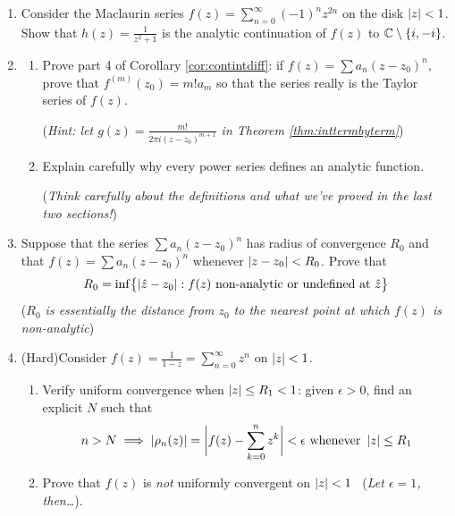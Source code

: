 \begin{exercises}
\begin{enumerate}
		
		\item Consider the Maclaurin series $f(z)=\sum_{n=0}^\infty (-1)^nz^{2n}$ on the disk $\left| z\right|<1$. Show that $h(z)=\frac 1{z^2+1}$ is the analytic continuation of $f(z)$ to $\mathbb{C}\setminus\{i,-i\}$. 
		
		
		\item\label{ex:uniquetaylor}\begin{enumerate}
		  \item Prove part 4 of Corollary \ref{cor:contintdiff}: if $f(z)= \sum a_n(z-z_0)^n$, prove that $f^{(m)}(z_0)=m!a_m$ so that the series really is the Taylor series of $f(z)$.\par
			(\emph{Hint: let $g(z) =\frac{m!}{2\pi i(z-z_0)^{m+1}}$ in Theorem \ref{thm:inttermbyterm}})
			\item Explain carefully why every power series defines an analytic function.\par
	  (\emph{Think carefully about the definitions and what we've proved in the last two sections!})
		\end{enumerate}
		
		
		\item\label{exs:raddistnonanalytic} Suppose that the series $\sum a_n(z-z_0)^n$ has radius of convergence $R_0$ and that $f(z)=\sum a_n(z-z_0)^n$ whenever $\left| z-z_0\right|<R_0$. Prove that
		\[
			R_0=\inf\bigl\{\left| \hat z-z_0\right|:f(z)\text{ non-analytic or undefined at $\hat z$}\bigr\}
		\]
		(\emph{$R_0$ is essentially the distance from $z_0$ to the nearest point at which $f(z)$ is non-analytic})
		
		
		\item\label{ex:notuniform} (Hard)\lstsp Consider $f(z)=\frac 1{1-z}=\sum\limits_{n=0}^\infty z^n$ on $\left| z\right|<1$.
		\begin{enumerate}
		  \item Verify uniform convergence when $\left| z\right|\le R_1<1$: given $\epsilon>0$, find an explicit $N$ such that
		  \[
		  	n>N\implies \left| \rho_n(z)\right|=\biggl|f(z)-\sum_{k=0}^nz^k\biggr|<\epsilon\text{ whenever }\left| z\right|\le R_1
		  \]
		  \item Prove that $f(z)$ is \emph{not} uniformly convergent on $\left| z\right|<1$ \ (\emph{Let $\epsilon=1$, then\ldots}).
		\end{enumerate}
	\end{enumerate}
\end{exercises}
